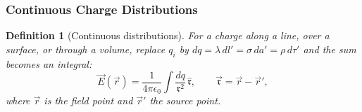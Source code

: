 \documentclass{article}
\newtheorem{definition}{Definition}
\begin{document}
\subsubsection{Continuous Charge Distributions}
\begin{definition}[Continuous distributions]
    For a charge along a line, over a surface, or through a volume, replace $q_i$ by $dq = \lambda\,dl' = \sigma\,da' = \rho\,d\tau'$ and the sum becomes an integral:
    \begin{equation}
        \label{eq:E-continuous}
        \vec{E}(\vec{r}) = \frac{1}{4\pi\epsilon_0}\int\frac{dq}{\mathfrak{r}^2}\,\hat{\mathfrak{r}},
        \qquad \vec{\mathfrak{r}} = \vec{r} - \vec{r}',
    \end{equation}
    where $\vec{r}$ is the field point and $\vec{r}'$ the source point.
\end{definition}
\end{document}

